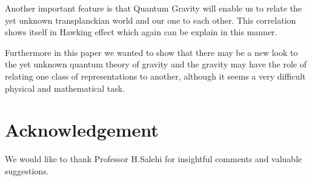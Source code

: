 \documentclass[12pt,a4paper]{article}
\begin{document}
Another important feature is that Quantum Gravity will enable us to relate the yet unknown transplanckian world and our one to each other. This correlation shows itself in Hawking effect which again can be explain in this manner.

Furthermore in this paper we wanted to show that there may be a new look to the yet unknown quantum theory of gravity and the gravity may have the role of relating one class of representations to another, although it seems a very difficult physical and mathematical task.
\section*{Acknowledgement}
We would like to thank Professor H.Salehi for insightful comments and valuable suggestions.


\end{document}
